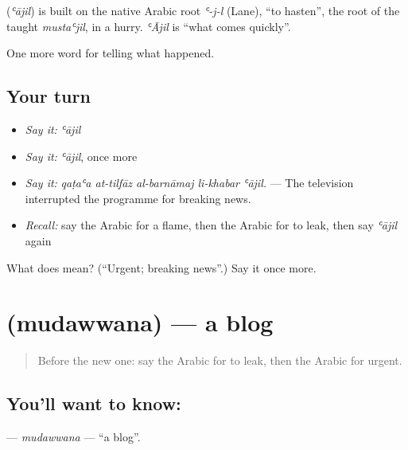 \begin{cousinweb}
\textbf{} (\emph{ʿājil}) is built on the native Arabic root \emph{ʿ-j-l} (Lane), \textquotedblleft{}to hasten\textquotedblright{}, the root of the taught \emph{mustaʿjil}, in a hurry. \emph{ʿĀjil} is \textquotedblleft{}what comes quickly\textquotedblright{}.
\end{cousinweb}

\begin{grammarlens}[title={What you've built}]
One more word for telling what happened.
\end{grammarlens}

\subsection*{Your turn}
\begin{itemize}
\raggedright
  \item \emph{Say it:} \emph{ʿājil}
  \item \emph{Say it:} \emph{ʿājil}, once more
  \item \emph{Say it:} \emph{qaṭaʿa at-tilfāz al-barnāmaj li-khabar ʿājil.} — The television interrupted the programme for breaking news.
  \item \emph{Recall:} say the Arabic for a flame, then the Arabic for to leak, then say \emph{ʿājil} again
\end{itemize}

\begin{tcolorbox}[breakable,colback=teal!4,colframe=teal!35!black,title={Before you move on}]
What does  mean? (\textquotedblleft{}Urgent; breaking news\textquotedblright{}.) Say it once more.
\end{tcolorbox}
\section[\texorpdfstring{\ar{مدونة} (mudawwana)}{مدونة (mudawwana)}]{ (mudawwana) — a blog}

\label{lesson:AR-C355-mudawwana}



\begin{quote}
Before the new one: say the Arabic for to leak, then the Arabic for urgent.
\end{quote}

\subsection*{You'll want to know: }
\textbf{} — \emph{mudawwana} — \textquotedblleft{}a blog\textquotedblright{}.

